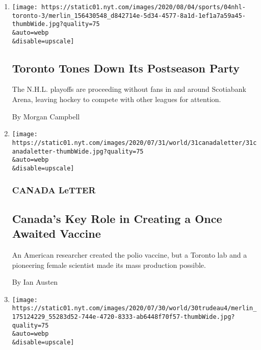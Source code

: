 \begin{enumerate}
\def\labelenumi{\arabic{enumi}.}
\item
  \href{/2020/08/04/sports/toronto-nhl-playoffs.html}{}

  \texttt{[image: https://static01.nyt.com/images/2020/08/04/sports/04nhl-toronto-3/merlin\_156430548\_d842714e-5d34-4577-8a1d-1ef1a7a59a45-thumbWide.jpg?quality=75\\\&auto=webp\\\&disable=upscale]}

  \hypertarget{toronto-tones-down-its-postseason-party}{%
  \subsection{Toronto Tones Down Its Postseason
  Party}\label{toronto-tones-down-its-postseason-party}}

  The N.H.L. playoffs are proceeding without fans in and around
  Scotiabank Arena, leaving hockey to compete with other leagues for
  attention.

  By Morgan Campbell
\item
  \href{/2020/07/31/world/canada/leone-farrell-chemist.html}{}

  \texttt{[image: https://static01.nyt.com/images/2020/07/31/world/31canadaletter/31canadaletter-thumbWide.jpg?quality=75\\\&auto=webp\\\&disable=upscale]}

  \hypertarget{canada-letter}{%
  \subsubsection{CANADA LeTTER}\label{canada-letter}}

  \hypertarget{canadas-key-role-in-creating-a-once-awaited-vaccine}{%
  \subsection{Canada's Key Role in Creating a Once Awaited
  Vaccine}\label{canadas-key-role-in-creating-a-once-awaited-vaccine}}

  An American researcher created the polio vaccine, but a Toronto lab
  and a pioneering female scientist made its mass production possible.

  By Ian Austen
\item
  \href{/2020/07/30/world/canada/justin-trudeau-we-charity.html}{}

  \texttt{[image: https://static01.nyt.com/images/2020/07/30/world/30trudeau4/merlin\_175124229\_55283d52-744e-4720-8333-ab6448f70f57-thumbWide.jpg?quality=75\\\&auto=webp\\\&disable=upscale]}


\end{enumerate}
